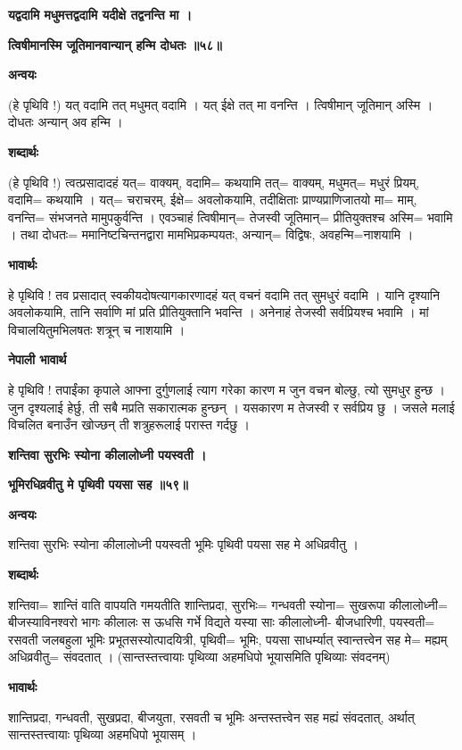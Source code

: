 \documentclass[11pt, a5paper]{article}
\begin{document}
\textbf{यद्वदामि मधुमत्तद्वदामि यदीक्षे तद्वनन्ति मा ।}

\textbf{त्विषीमानस्मि जूतिमानवान्यान् हन्मि दोधतः ॥५८॥}

\textbf{अन्वयः}

(हे पृथिवि !) यत् वदामि तत् मधुमत् वदामि । यत् ईक्षे तत् मा वनन्ति । त्विषीमान् जूतिमान् अस्मि । दोधतः अन्यान् अव हन्मि ।

\textbf{शब्दार्थः}

(हे पृथिवि !) त्वत्प्रसादादहं यत्= वाक्यम्, वदामि= कथयामि तत्= वाक्यम्, मधुमत्= मधुरं प्रियम्, वदामि= कथयामि । यत्= चराचरम्, ईक्षे= अवलोकयामि, तदीक्षिताः प्राण्यप्राणिजातयो मा= माम्, वनन्ति= संभजनते मामुपकुर्वन्ति । एवञ्चाहं त्विषीमान्= तेजस्वी जूतिमान्= प्रीतियुक्तश्च अस्मि= भवामि । तथा दोधतः= ममानिष्टचिन्तनद्वारा मामभिप्रकम्पयतः, अन्यान्= विद्विषः, अवहन्मि=नाशयामि ।

\textbf{भावार्थः}

हे पृथिवि ! तव प्रसादात् स्वकीयदोषत्यागकारणादहं यत् वचनं वदामि तत् सुमधुरं वदामि । यानि दृश्यानि अवलोकयामि, तानि सर्वाणि मां प्रति प्रीतियुक्तानि भवन्ति । अनेनाहं तेजस्वी सर्वप्रियश्च भवामि । मां विचालयितुमभिलषतः शत्रून् च नाशयामि ।

\textbf{नेपाली भावार्थ}

हे पृथिवि ! तपाईंका कृपाले आफ्ना दुर्गुणलाई त्याग गरेका कारण म जुन वचन बोल्छु, त्यो सुमधुर हुन्छ । जुन दृश्यलाई हेर्छु, ती सबै मप्रति सकारात्मक हुन्छन् । यसकारण म तेजस्वी र सर्वप्रिय छु । जसले मलाई विचलित बनाउँन खोज्छन् ती शत्रुहरूलाई परास्त गर्दछु ।

\textbf{शन्तिवा सुरभिः स्योना कीलालोध्नी पयस्वती ।}

\textbf{भूमिरधिव्रवीतु मे पृथिवी पयसा सह ॥५९॥}

\textbf{अन्वयः}

शन्तिवा सुरभिः स्योना कीलालोध्नी पयस्वती भूमिः पृथिवी पयसा सह मे अधिव्रवीतु ।

\textbf{शब्दार्थः}

शन्तिवा= शान्तिं वाति वापयति गमयतीति शान्तिप्रदा, सुरभिः= गन्धवती स्योना= सुखरूपा कीलालोध्नी= बीजस्याविनश्वरो भागः कीलालः स ऊधसि गर्भे विद्यते यस्या साः कीलालोध्नी- बीजधारिणी, पयस्वती= रसवती जलबहुला भूमिः प्रभूतसस्योत्पादयित्री, पृथिवी= भूमिः, पयसा साधर्म्यात् स्वान्तत्त्वेन सह मे= मह्यम् अधिव्रवीतु= संवदतात् । (सान्तस्तत्त्वायाः पृथिव्या अहमधिपो भूयासमिति पृथिव्याः संवदनम्)

\textbf{भावार्थः}

शान्तिप्रदा, गन्धवती, सुखप्रदा, बीजयुता, रसवती च भूमिः अन्तस्तत्त्वेन सह मह्यं संवदतात्, अर्थात् सान्तस्तत्त्वायाः पृथिव्या अहमधिपो भूयासम् ।
\end{document}
